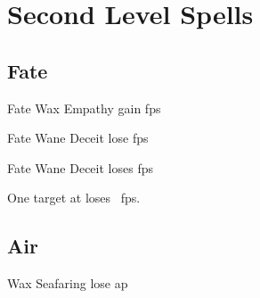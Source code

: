 \section{Second Level Spells}

\begin{multicols}{2}

\subsection{Fate}

  {Fate}%
  {Wax}%
  {\duplicated}%
  {Empathy}%
  {gain  \glspl{fp}}%

  {Fate}%
  {Wane}%
  {\duplicated}%
  {Deceit}%
  {lose  \glspl{fp}}%

  {Fate}%
  {Wane}%
  {\distant}%
  {Deceit}%
  {loses  \glspl{fp}}%

One target at \spellRange{} loses ~\glspl{fp}.

\subsection{Air}

  {\mAir}%
  {Wax}%
  {\duplicated}%
  {Seafaring}%
  {lose  \gls{ap}}%

\end{multicols}
